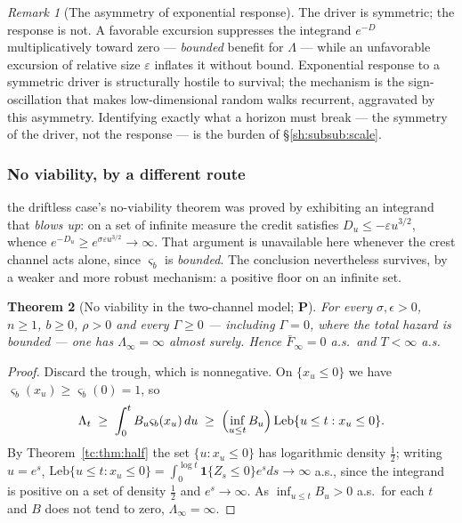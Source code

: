 \documentclass[11pt]{article}
\numberwithin{equation}{section}
\theoremstyle{plain}
\newtheorem{theorem}{Theorem}[section]
\theoremstyle{definition}
\theoremstyle{remark}
\newtheorem{remark}[theorem]{Remark}
\newcommand{\one}{\mathbf{1}}
\begin{document}
\begin{remark}[The asymmetry of exponential response]\label{sh:rem:asym}
The driver is symmetric; the response is not. A favorable excursion
suppresses the integrand $e^{-D}$ multiplicatively toward zero ---
\emph{bounded} benefit for $\Lambda$ --- while an unfavorable excursion of
relative size $\varepsilon$ inflates it without bound. Exponential response
to a symmetric driver is structurally hostile to survival; the mechanism is
the sign-oscillation that makes low-dimensional random walks recurrent,
aggravated by this asymmetry. Identifying exactly what a horizon must break
--- the symmetry of the driver, not the response --- is the burden of
\S\ref{sh:subsub:scale}.
\end{remark}

\subsubsection{No viability, by a different route}\label{tc:subsub:noviab}

the driftless case's no-viability theorem was proved by exhibiting an integrand
that \emph{blows up}: on a set of infinite measure the credit satisfies
$D_u\le-\varepsilon u^{3/2}$, whence $e^{-D_u}\ge
e^{\sigma\varepsilon u^{3/2}}\to\infty$. That argument is unavailable
here whenever the crest channel acts alone, since $\varsigma_b$ is
\emph{bounded}. The conclusion nevertheless survives, by a weaker and
more robust mechanism: a positive floor on an infinite set.

\begin{theorem}[No viability in the two-channel model; \textbf{P}]
\label{tc:thm:noviab2}
For every $\sigma,\epsilon>0$, $n\ge1$, $b\ge0$, $\rho>0$ and every
$\Gamma\ge0$ --- including $\Gamma=0$, where the total hazard is
bounded --- one has $\Lambda_{\infty}=\infty$ almost surely. Hence
$\bar F_{\infty}=0$ a.s.\ and $T<\infty$ a.s.
\end{theorem}

\begin{proof}
Discard the trough, which is nonnegative. On $\{x_u\le0\}$ we have
$\varsigma_b(x_u)\ge\varsigma_b(0)=1$, so
\[
\Lambda_{t}\;\ge\;\int_{0}^{t}B_u\varsigma_b(x_u)\,du
\;\ge\;\Bigl(\inf_{u\le t}B_u\Bigr)\,
\mathrm{Leb}\{u\le t:x_u\le0\}.
\]
By Theorem~\ref{tc:thm:half} the set $\{u:x_u\le0\}$ has logarithmic
density $\tfrac12$; writing $u=e^{s}$,
$\mathrm{Leb}\{u\le t:x_u\le0\}=\int_{0}^{\log t}\one\{Z_s\le0\}e^{s}ds
\to\infty$ a.s., since the integrand is positive on a set of density
$\tfrac12$ and $e^{s}\to\infty$. As $\inf_{u\le t}B_u>0$ a.s.\ for each
$t$ and $B$ does not tend to zero, $\Lambda_{\infty}=\infty$.
\end{proof}
\end{document}
